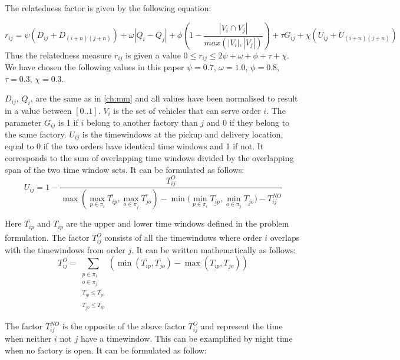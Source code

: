 \documentclass[../main.tex]{subfiles}
\begin{document}
The relatedness factor is given by the following equation:

\begin{equation}
\label{relatedness}
    r_{ij} = \psi ( D_{i j} + D_{(i+n)(j+n)}) + \omega|Q_i - Q_j|
    + \phi (1-\dfrac{|V_i\cap V_j|}{max(|V_i|, |V_j|)} ) + \tau G_{ij} + \chi (U_{ij} + U_{(i+n)(j+n)})
\end{equation}
Thus the relatedness measure $r_{ij}$ is given a value $0\leq r_{ij} \leq 2\psi + \omega + \phi + \tau  + \chi$. 
We have chosen the following values in this paper $\psi=0.7$, $\omega=1.0$, $\phi=0.8$, $\tau=0.3$, $\chi = 0.3$. \par

$D_{ij}$, $Q_i$, are the same as in \cref{ch:mm} and all values have been normalised to result in a value between $[0..1]$. 
$V_i$ is the set of vehicles that can serve order $i$. 
The parameter $G_{ij}$ is 1 if $i$ belong to another factory than $j$ and 0 if they belong to the same factory. 
$U_{ij}$ is the timewindows at the pickup and delivery location, equal to 0 if the two orders have identical time windows and 1 if not. It corresponds to the sum of overlapping time windows divided by the overlapping span of the two time window sets.
It can be formulated as follows:
\begin{equation}
    \label{overlaptime}
    U_{ij} = 1 - 
    \dfrac{T^O_{ij}}
    {\max{(\max\limits_{p\in \pi_i} \overline{T_{ip}}, \max\limits_{o\in \pi_j} \overline{T_{jo}})} - 
    \min{(\min\limits_{p\in \pi_i} \underline{T_{ip}}, \min\limits_{o\in \pi_j} \underline{T_{jo}}}) -  T^{NO}_{ij} }
\end{equation}

Here $\overline{T_{ip}}$ and $\underline{T_{ip}}$ are the upper and lower time windows defined in the problem formulation.
The factor $T^O_{ij}$ consists of all the timewindows where order $i$ overlaps with the timewindows from order $j$. It can be written mathematically as follows:
\begin{equation}\label{eq:ot}
    T^O_{ij}=\sum\limits_{\substack{p\in \pi_i\\ o\in \pi_j\\ \underline{T_{ip}}\leq \overline{T_{jo}}\\ \underline{T_{jo}}\leq\overline{T_{ip}}}} (\min(\overline{T_{ip}}, \overline{T_{jo}}) - \max(\underline{T_{ip}},\underline{T_{jo}}) )
\end{equation}

The factor $T^{NO}_{ij}$ is the opposite of the above factor $T^O_{ij}$ and represent the time when neither $i$ not $j$ have a timewindow. This can be examplified by night time when no factory is open. It can be formulated as follow:
\end{document}
